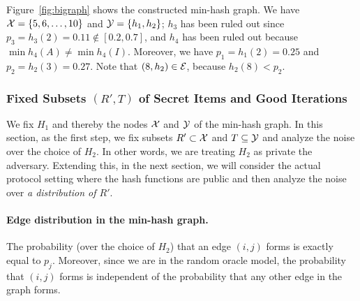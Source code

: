 Figure~\ref{fig:bigraph} shows the constructed min-hash graph.
%
We have $\mathcal{X} = \{5, 6, \ldots, 10\}$ and $\mathcal{Y} =
\{h_1, h_2\}$; $h_3$ has been ruled out since $p_3 = h_3(2) = 0.11 \not
\in [0.2, 0.7]$, and $h_4$ has been ruled out because $\min h_4(A) \ne
\min h_4(I)$. Moreover, we have $p_1 = h_1(2) = 0.25$ and $p_2 = h_2(3)
= 0.27$. Note that $(8, h_2) \in \mathcal{E}$, because $h_2(8) < p_2$.



\subsubsection{Fixed Subsets $(R',T)$ of Secret Items and Good Iterations}
We fix $H_1$ and thereby the nodes $\mathcal{X}$ and $\mathcal{Y}$ of the min-hash
graph.  In this section, as the first step, we fix subsets $R' \subset
\mathcal{X}$ and $T \subseteq \mathcal{Y}$ and analyze the noise over the choice of
$H_2$. In other words, we are treating $H_2$ as private the adversary. Extending
this, in the next section, we will consider the actual protocol setting where
the hash functions are public and then analyze the noise over {\em a
distribution of $R'$}.


\paragraph{Edge distribution in the min-hash graph.}
The probability (over the choice of $H_2$) that an edge $(i,j)$ forms is exactly
equal to $p_j$. Moreover, since we are in the random oracle model, the
probability that $(i,j)$ forms is independent of the probability that any other
edge in the graph forms. 

